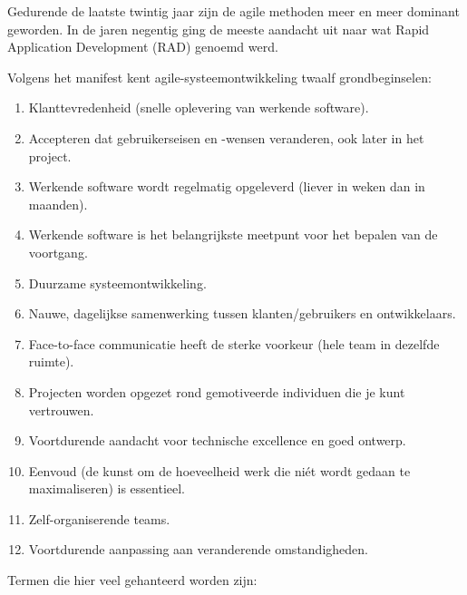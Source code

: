 Gedurende de laatste twintig jaar zijn de agile methoden meer en meer dominant geworden. In de jaren negentig ging de meeste aandacht uit naar wat Rapid Application Development (RAD) genoemd werd.

Volgens het manifest kent agile-systeemontwikkeling twaalf grondbeginselen:

\begin{enumerate}
    \item Klanttevredenheid (snelle oplevering van werkende software).
    \item Accepteren dat gebruikerseisen en -wensen veranderen, ook later in het project.
    \item Werkende software wordt regelmatig opgeleverd (liever in weken dan in maanden).
    \item Werkende software is het belangrijkste meetpunt voor het bepalen van de voortgang.
    \item Duurzame systeemontwikkeling.
    \item Nauwe, dagelijkse samenwerking tussen klanten/gebruikers en ontwikkelaars.
    \item Face-to-face communicatie heeft de sterke voorkeur (hele team in dezelfde ruimte).
    \item Projecten worden opgezet rond gemotiveerde individuen die je kunt vertrouwen.
    \item Voortdurende aandacht voor technische excellence en goed ontwerp.
    \item Eenvoud (de kunst om de hoeveelheid werk die niét wordt gedaan te maximaliseren) is essentieel.
    \item Zelf-organiserende teams.
    \item Voortdurende aanpassing aan veranderende omstandigheden.
\end{enumerate}
\newpage
Termen die hier veel gehanteerd worden zijn:

